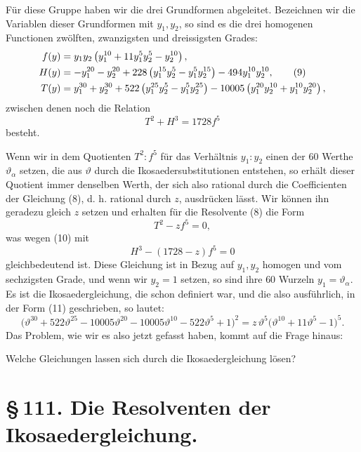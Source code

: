 \documentclass[11pt]{article}
\begin{document}
Für diese Gruppe haben wir die drei Grundformen abgeleitet. Bezeichnen wir die Variablen dieser Grundformen mit \(y_1,y_2\), so sind es die drei homogenen Functionen zwölften, zwanzigsten und dreissigsten Grades:
\begin{align}
f(y)&=y_1y_2\left(y_1^{10}+11y_1^5y_2^5-y_2^{10}\right),\notag\\
H(y)&=-y_1^{20}-y_2^{20}+228\left(y_1^{15}y_2^5-y_1^5y_2^{15}\right)-494y_1^{10}y_2^{10},\tag{9}\\
T(y)&=y_1^{30}+y_2^{30}+522\left(y_1^{25}y_2^5-y_1^5y_2^{25}\right)
-10005\left(y_1^{20}y_2^{10}+y_1^{10}y_2^{20}\right),\notag
\end{align}
zwischen denen noch die Relation
\begin{equation}
T^2+H^3=1728 f^5
\tag{10}
\end{equation}
besteht.

Wenn wir in dem Quotienten \(T^2:f^5\) für das Verhältnis \(y_1:y_2\) einen der \(60\) Werthe \(\vartheta_\alpha\) setzen, die aus \(\vartheta\) durch die Ikosaedersubstitutionen entstehen, so erhält dieser Quotient immer denselben Werth, der sich also rational durch die Coefficienten der Gleichung (8), d. h. rational durch \(z\), ausdrücken lässt. Wir können ihn geradezu gleich \(z\) setzen und erhalten für die Resolvente (8) die Form
\begin{equation}
T^2-zf^5=0,
\tag{11}
\end{equation}
was wegen (10) mit
\[
H^3-(1728-z)f^5=0
\]
gleichbedeutend ist. Diese Gleichung ist in Bezug auf \(y_1,y_2\) homogen und vom sechzigsten Grade, und wenn wir \(y_2=1\) setzen, so sind ihre \(60\) Wurzeln \(y_1=\vartheta_\alpha\). Es ist die Ikosaedergleichung, die schon definiert war, und die also ausführlich, in der Form (11) geschrieben, so lautet:
\[
\bigl(\vartheta^{30}+522\vartheta^{25}-10005\vartheta^{20}
-10005\vartheta^{10}-522\vartheta^5+1\bigr)^2
=
z\,\vartheta^5\bigl(\vartheta^{10}+11\vartheta^5-1\bigr)^5.
\]
Das Problem, wie wir es also jetzt gefasst haben, kommt auf die Frage hinaus:

\begin{center}
Welche Gleichungen lassen sich durch die Ikosaedergleichung lösen?
\end{center}


\section*{\S\,111. Die Resolventen der Ikosaedergleichung.}
\end{document}
